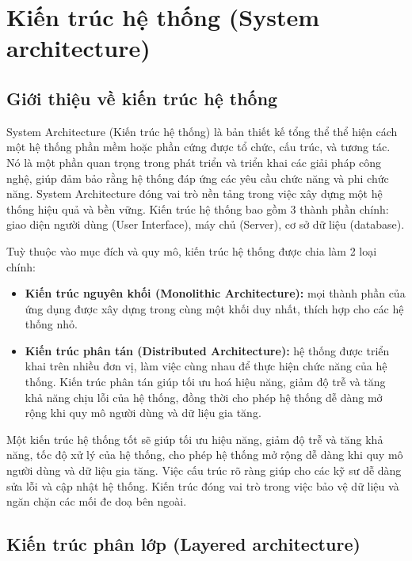 \section{Kiến trúc hệ thống (System architecture)}

\subsection{Giới thiệu về kiến trúc hệ thống}

System Architecture (Kiến trúc hệ thống) là bản thiết kế tổng thể thể hiện cách một hệ thống phần mềm hoặc phần cứng được tổ chức, cấu trúc, và tương tác. Nó là một phần quan trọng trong phát triển và triển khai các giải pháp công nghệ, giúp đảm bảo rằng hệ thống đáp ứng các yêu cầu chức năng và phi chức năng. System Architecture đóng vai trò nền tảng trong việc xây dựng một hệ thống hiệu quả và bền vững. Kiến trúc hệ thống bao gồm 3 thành phần chính: giao diện người dùng (User Interface), máy chủ (Server), cơ sở dữ liệu (database).

Tuỳ thuộc vào mục đích và quy mô, kiến trúc hệ thống được chia làm 2 loại chính:

\begin{itemize}
    \item \textbf{Kiến trúc nguyên khối (Monolithic Architecture):} mọi thành phần của ứng dụng được xây dựng trong cùng một khối duy nhất, thích hợp cho các hệ thống nhỏ.
    \item \textbf{Kiến trúc phân tán (Distributed Architecture):} hệ thống được triển khai trên nhiều đơn vị, làm việc cùng nhau để thực hiện chức năng của hệ thống. Kiến trúc phân tán giúp tối ưu hoá hiệu năng, giảm độ trễ và tăng khả năng chịu lỗi của hệ thống, đồng thời cho phép hệ thống dễ dàng mở rộng khi quy mô người dùng và dữ liệu gia tăng.
\end{itemize}

Một kiến trúc hệ thống tốt sẽ giúp tối ưu hiệu năng, giảm độ trễ và tăng khả năng, tốc độ xử lý của hệ thống, cho phép hệ thống mở rộng dễ dàng khi quy mô người dùng và dữ liệu gia tăng. Việc cấu trúc rõ ràng giúp cho các kỹ sư dễ dàng sửa lỗi và cập nhật hệ thống. Kiến trúc đóng vai trò trong việc bảo vệ dữ liệu và ngăn chặn các mối đe doạ bên ngoài.

\subsection{Kiến trúc phân lớp (Layered architecture)}

